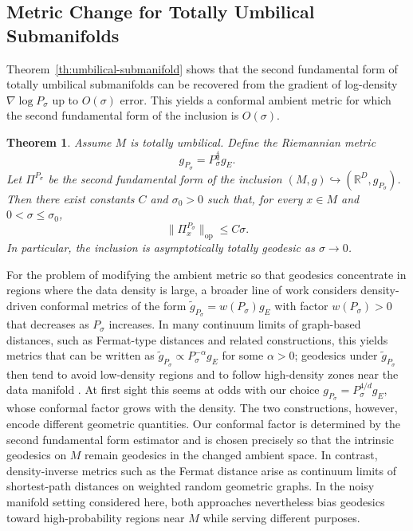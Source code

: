 \documentclass[11pt]{article}
\theoremstyle{plain}
\newtheorem{theorem}{Theorem}[section]
\theoremstyle{definition}
\begin{document}
\subsection{Metric Change for Totally Umbilical Submanifolds}
Theorem~\ref{th:umbilical-submanifold} shows that the second fundamental form of totally umbilical submanifolds can be recovered from the gradient of log-density $\nabla\log P_\sigma$ up to $O(\sigma)$ error. 
This yields a conformal ambient metric for which the second fundamental form of the inclusion is $O(\sigma)$.
\begin{theorem}\label{th:metric-totally-umbilical-submanifold}
Assume $M$ is totally umbilical. Define the Riemannian metric
\[
g_{P_\sigma} = P_\sigma^{\frac{4}{d}}g_E.
\]
Let $\Pi^{P_\sigma}$ be the second fundamental form of the inclusion $(M,g)\hookrightarrow (\mathbb R^D, g_{P_\sigma})$. Then there exist constants $C$ and $\sigma_0>0$ such that, for every $x\in M$ and $0<\sigma\le\sigma_0$,
\[
\|\Pi^{P_\sigma}_x\|_{\mathrm{op}} \le C\sigma.
\]
In particular, the inclusion is asymptotically totally geodesic as $\sigma\to0$.
\end{theorem}
For the problem of modifying the ambient metric so that geodesics concentrate in regions where the data density is large, a broader line of work considers density-driven conformal metrics of the form $\tilde{g}_{P_\sigma} = w(P_\sigma)g_E$ with factor $w(P_\sigma)>0$ that decreases as $P_\sigma$ increases. In many continuum limits of graph-based distances, such as Fermat-type distances and related constructions, this yields metrics that can be written as $\tilde{g}_{P_\sigma} \propto P_\sigma^{-\alpha}g_E$ for some $\alpha>0$; geodesics under $\tilde{g}_{P_\sigma}$ then tend to avoid low-density regions and to follow high-density zones near the data manifold \citep[e.g.,][]{Groisman2018NonhomogeneousEF,Trillos2024Fermat}. At first sight this seems at odds with our choice $g_{P_\sigma} = P_\sigma^{{4}/{d}}g_E$, whose conformal factor grows with the density. The two constructions, however, encode different geometric quantities. Our conformal factor is determined by the second fundamental form estimator and is chosen precisely so that the intrinsic geodesics on $M$ remain geodesics in the changed ambient space. In contrast, density-inverse metrics such as the Fermat distance arise as continuum limits of shortest-path distances on weighted random geometric graphs. In the noisy manifold setting considered here, both approaches nevertheless bias geodesics toward high-probability regions near $M$ while serving different purposes.
\end{document}
